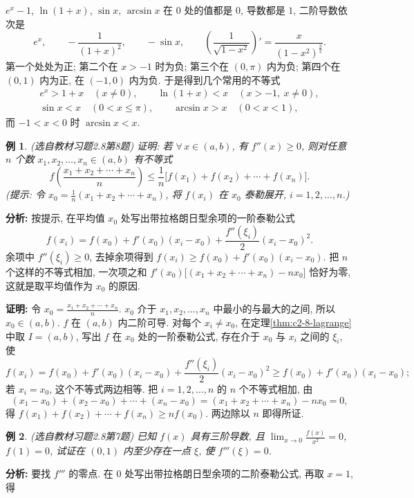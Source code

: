 \documentclass[UTF8,openany]{ctexbook}
\theoremstyle{chinesetextbook}
\newtheorem{example}{例}[section]
\newenvironment{cnproof}{\par\indent\textbf{证明:} \ignorespaces}{\par}
\begin{document}
$e^x-1$, $\ln(1+x)$, $\sin x$, $\arcsin x$ 在 $0$ 处的值都是 $0$, 导数都是 $1$, 二阶导数依次是
\[
e^x,\qquad-\frac1{(1+x)^2},\qquad-\sin x,\qquad\left(\frac1{\sqrt{1-x^2}}\right)'=\frac x{(1-x^2)^{\frac32}}.
\]
第一个处处为正; 第二个在 $x>-1$ 时为负; 第三个在 $(0,\pi)$ 内为负; 第四个在 $(0,1)$ 内为正, 在 $(-1,0)$ 内为负. 于是得到几个常用的不等式
\[
\begin{gathered}
e^x>1+x\quad(x\ne0),\qquad\ln(1+x)<x\quad(x>-1,\ x\ne0),\\
\sin x<x\quad(0<x\le\pi),\qquad\arcsin x>x\quad(0<x<1),
\end{gathered}
\]
而 $-1<x<0$ 时 $\arcsin x<x$.
\begin{example}\label{ex:c2-h8-8}
\textnormal{(选自教材习题2.8第8题)} 证明: 若 $\forall\,x\in(a,b)$, 有 $f''(x)\ge0$, 则对任意 $n$ 个数 $x_1,x_2,\ldots,x_n\in(a,b)$ 有不等式
\[
f\left(\frac{x_1+x_2+\cdots+x_n}n\right)\le\frac1n\bigl[f(x_1)+f(x_2)+\cdots+f(x_n)\bigr].
\]
(提示: 令 $\displaystyle x_0=\frac1n(x_1+x_2+\cdots+x_n)$, 将 $f(x_i)$ 在 $x_0$ 泰勒展开, $i=1,2,\ldots,n$.)
\end{example}
\par\indent\textbf{分析:} 按提示, 在平均值 $x_0$ 处写出带拉格朗日型余项的一阶泰勒公式
\[
f(x_i)=f(x_0)+f'(x_0)(x_i-x_0)+\frac{f''(\xi_i)}2(x_i-x_0)^2.
\]
余项中 $f''(\xi_i)\ge0$, 去掉余项得到 $f(x_i)\ge f(x_0)+f'(x_0)(x_i-x_0)$. 把 $n$ 个这样的不等式相加, 一次项之和 $f'(x_0)\bigl[(x_1+x_2+\cdots+x_n)-nx_0\bigr]$ 恰好为零, 这就是取平均值作为 $x_0$ 的原因.
\begin{cnproof}
令 $\displaystyle x_0=\frac{x_1+x_2+\cdots+x_n}n$. $x_0$ 介于 $x_1,x_2,\ldots,x_n$ 中最小的与最大的之间, 所以 $x_0\in(a,b)$. $f$ 在 $(a,b)$ 内二阶可导. 对每个 $x_i\ne x_0$, 在定理\ref{thm:c2-8-lagrange} 中取 $I=(a,b)$, 写出 $f$ 在 $x_0$ 处的一阶泰勒公式, 存在介于 $x_0$ 与 $x_i$ 之间的 $\xi_i$, 使
\[
f(x_i)=f(x_0)+f'(x_0)(x_i-x_0)+\frac{f''(\xi_i)}2(x_i-x_0)^2\ge f(x_0)+f'(x_0)(x_i-x_0);
\]
若 $x_i=x_0$, 这个不等式两边相等. 把 $i=1,2,\ldots,n$ 的 $n$ 个不等式相加, 由
\[
(x_1-x_0)+(x_2-x_0)+\cdots+(x_n-x_0)=(x_1+x_2+\cdots+x_n)-nx_0=0,
\]
得 $f(x_1)+f(x_2)+\cdots+f(x_n)\ge nf(x_0)$. 两边除以 $n$ 即得所证.
\end{cnproof}
\begin{example}\label{ex:c2-h8-7}
\textnormal{(选自教材习题2.8第7题)} 已知 $f(x)$ 具有三阶导数, 且 $\displaystyle\lim_{x\to0}\frac{f(x)}{x^2}=0$, $f(1)=0$, 试证在 $(0,1)$ 内至少存在一点 $\xi$, 使 $f'''(\xi)=0$.
\end{example}
\par\indent\textbf{分析:} 要找 $f'''$ 的零点. 在 $0$ 处写出带拉格朗日型余项的二阶泰勒公式, 再取 $x=1$, 得
\end{document}
